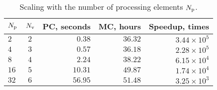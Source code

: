 \begin{table}
  \centering
  \caption{Scaling with the number of processing elements ${N_\text{p}}$.}
  \vspace{-10pt}
  \begin{tabular}{lcrrr}
    \toprule
    ${N_\text{p}}$ & ${N_\text{v}}$ & PC, seconds & MC, hours & Speedup, times \\
    \midrule
    $ 2$ & $2$ & $ 0.38$ & $36.32$ & $3.44 \times 10^5$ \\
    $ 4$ & $3$ & $ 0.57$ & $36.18$ & $2.28 \times 10^5$ \\
    $ 8$ & $4$ & $ 2.24$ & $38.22$ & $6.15 \times 10^4$ \\
    $16$ & $5$ & $10.31$ & $49.87$ & $1.74 \times 10^4$ \\
    $32$ & $6$ & $56.95$ & $51.48$ & $3.25 \times 10^3$ \\
    \bottomrule
  \end{tabular}
  \vspace{-10pt}
\end{table}

